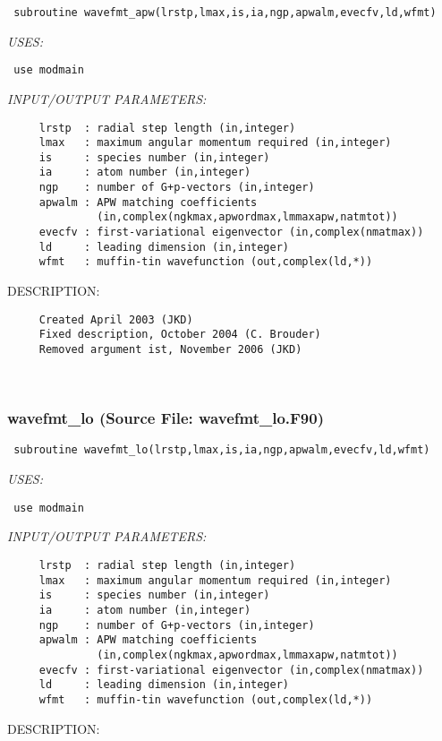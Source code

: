\documentclass[11pt]{article}
\begin{document}
\begin{verbatim} subroutine wavefmt_apw(lrstp,lmax,is,ia,ngp,apwalm,evecfv,ld,wfmt)\end{verbatim}{\em USES:}
\begin{verbatim} use modmain\end{verbatim}{\em INPUT/OUTPUT PARAMETERS:}
\begin{verbatim}     lrstp  : radial step length (in,integer)
     lmax   : maximum angular momentum required (in,integer)
     is     : species number (in,integer)
     ia     : atom number (in,integer)
     ngp    : number of G+p-vectors (in,integer)
     apwalm : APW matching coefficients
              (in,complex(ngkmax,apwordmax,lmmaxapw,natmtot))
     evecfv : first-variational eigenvector (in,complex(nmatmax))
     ld     : leading dimension (in,integer)
     wfmt   : muffin-tin wavefunction (out,complex(ld,*))\end{verbatim}
{\sf DESCRIPTION:\\ }


  
\begin{verbatim}     Created April 2003 (JKD)
     Fixed description, October 2004 (C. Brouder)
     Removed argument ist, November 2006 (JKD)\end{verbatim}


 
 
\mbox{}\hrulefill\ 
 
\subsubsection{wavefmt\_lo (Source File: wavefmt\_lo.F90)}


\begin{verbatim} subroutine wavefmt_lo(lrstp,lmax,is,ia,ngp,apwalm,evecfv,ld,wfmt)\end{verbatim}{\em USES:}
\begin{verbatim} use modmain\end{verbatim}{\em INPUT/OUTPUT PARAMETERS:}
\begin{verbatim}     lrstp  : radial step length (in,integer)
     lmax   : maximum angular momentum required (in,integer)
     is     : species number (in,integer)
     ia     : atom number (in,integer)
     ngp    : number of G+p-vectors (in,integer)
     apwalm : APW matching coefficients
              (in,complex(ngkmax,apwordmax,lmmaxapw,natmtot))
     evecfv : first-variational eigenvector (in,complex(nmatmax))
     ld     : leading dimension (in,integer)
     wfmt   : muffin-tin wavefunction (out,complex(ld,*))\end{verbatim}
{\sf DESCRIPTION:\\ }
\end{document}
